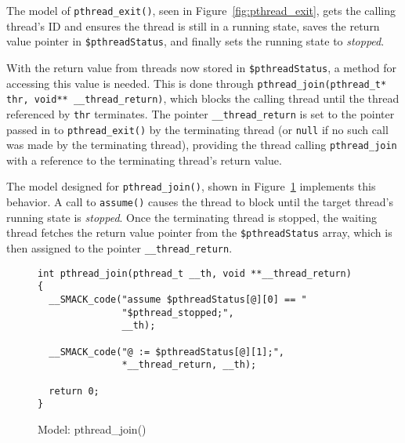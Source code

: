 The model of \lstinline|pthread_exit()|, seen in
Figure~\ref{fig:pthread_exit}, gets the calling thread's ID and
ensures the thread is still in a running state, saves the return value
pointer in \lstinline|$pthreadStatus|, and finally sets the running
state to \emph{stopped}.

With the return value from threads now stored in
\lstinline|$pthreadStatus|, a method for accessing this value is
needed.  This is done through 
\lstinline[breaklines]|pthread_join(pthread_t* thr, void** __thread_return)|,
which blocks the calling thread until the thread referenced by 
\lstinline|thr| terminates. The pointer \lstinline|__thread_return| is
set to the pointer passed in to \lstinline|pthread_exit()| by the
terminating thread (or \lstinline|null| if no such call was made by
the terminating thread), providing the thread calling
\lstinline|pthread_join| with a reference to the terminating thread's
return value.


The model designed for \lstinline|pthread_join()|, shown in
Figure~\ref{fig:pthread_join} implements this behavior.  A call to
\lstinline|assume()| causes the thread to block until the target
thread's running state is \emph{stopped}.  Once the terminating thread
is stopped, the waiting thread fetches the return value pointer from
the \lstinline|$pthreadStatus| array, which is then assigned to the
pointer \lstinline|__thread_return|.


\begin{figure}[h]
\centering
\caption{Model: pthread\_join()}\label{fig:pthread_join}
\begin{lstlisting}
int pthread_join(pthread_t __th, void **__thread_return)
{
  __SMACK_code("assume $pthreadStatus[@][0] == "
               "$pthread_stopped;",
               __th);

  __SMACK_code("@ := $pthreadStatus[@][1];",
               *__thread_return, __th);

  return 0;
}

\end{lstlisting}
\end{figure}

